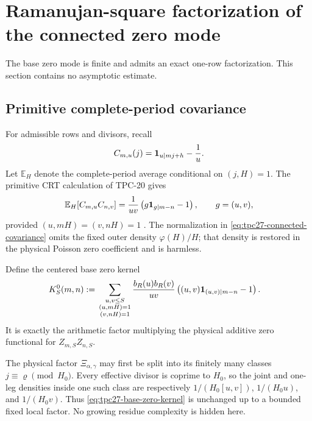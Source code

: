 \section{Ramanujan-square factorization of the connected zero mode}
\label{sec:tpc27-Ramanujan-factorization}

The base zero mode is finite and admits an exact one-row
factorization.  This section contains no asymptotic estimate.

\subsection{Primitive complete-period covariance}

For admissible rows and divisors, recall
\[
 C_{m,u}(j)=\mathbf 1_{u\mid mj+h}-\frac1u.
\]
Let \(\mathbb E_H\) denote the complete-period average conditional on
\((j,H)=1\).  The primitive CRT calculation of TPC-20 gives
\begin{equation}
 \mathbb E_H\!\left[C_{m,u}C_{n,v}\right]
 =\frac1{uv}
 \left(g\mathbf 1_{g\mid m-n}-1\right),
 \qquad g=(u,v),
 \label{eq:tpc27-connected-covariance}
\end{equation}
provided \((u,mH)=(v,nH)=1\)
\citep{WangTPC20}.  The normalization in
\eqref{eq:tpc27-connected-covariance} omits the fixed outer density
\(\varphi(H)/H\); that density is restored in the physical Poisson
zero coefficient and is harmless.

Define the centered base zero kernel
\begin{align}
 K_S^0(m,n)
 :={}&
 \sum_{\substack{u,v\le S\\
                   (u,mH)=1\\(v,nH)=1}}
 \frac{b_R(u)b_R(v)}{uv}
 \left((u,v)\mathbf 1_{(u,v)\mid m-n}-1\right).
 \label{eq:tpc27-base-zero-kernel}
\end{align}
It is exactly the arithmetic factor multiplying the physical additive
zero functional for \(Z_{m,S}Z_{n,S}\).

\begin{remark}
\label{rem:tpc27-fixed-residue-zero}
The physical factor \(\Xi_{\alpha,\gamma}\) may first be split into its
finitely many classes \(j\equiv\varrho\pmod{H_0}\).  Every effective
divisor is coprime to \(H_0\), so the joint and one-leg densities inside
one such class are respectively \(1/(H_0[u,v])\), \(1/(H_0u)\), and
\(1/(H_0v)\).  Thus \eqref{eq:tpc27-base-zero-kernel} is unchanged up
to a bounded fixed local factor.  No growing residue complexity is
hidden here.
\end{remark}

